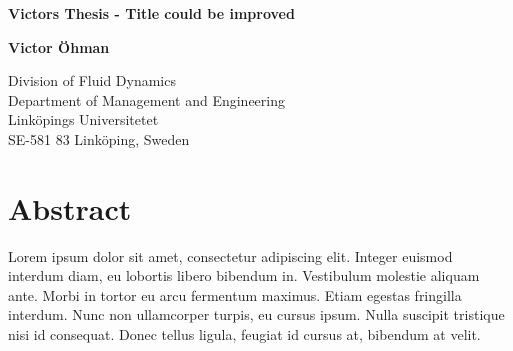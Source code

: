 \documentclass[11pt,a4paper,twoside]{article}
\begin{document}
\newlength{\figurewidth}\setlength{\figurewidth}{0.95\textwidth}
\begin{titlepage}
  \begin{center}


    \begin{LARGE}
      \bfseries
      Victors Thesis - Title could be improved\\
    \end{LARGE}

    \vspace{1cm}

    \begin{Large}
      \bfseries
       Victor Öhman\\[1ex]
    \end{Large}

    \vspace{1cm}
    \vspace{1.5cm}
    \begin{small}
      Division of Fluid Dynamics\\
			Department of Management and Engineering\\
      Linköpings Universitetet\\
      SE-581 83 Linköping, Sweden\\

    \end{small}
    \vspace{1cm}
     \vspace{0.5cm}
		 \begin{small}
      \bfseries
    \end{small}
	\end{center}
\end{titlepage}
\raggedbottom
\thispagestyle{empty}
\cleardoublepage


\section*{Abstract} %

Lorem ipsum dolor sit amet, consectetur adipiscing elit. Integer euismod interdum diam, eu lobortis libero bibendum in. Vestibulum molestie aliquam ante. Morbi in tortor eu arcu fermentum maximus. Etiam egestas fringilla interdum. Nunc non ullamcorper turpis, eu cursus ipsum. Nulla suscipit tristique nisi id consequat. Donec tellus ligula, feugiat id cursus at, bibendum at velit.
\end{document}

